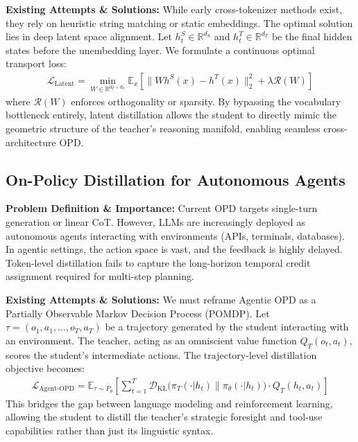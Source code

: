 \documentclass{article} %
\begin{document}
\textbf{Existing Attempts \& Solutions:} While early cross-tokenizer methods exist, they rely on heuristic string matching or static embeddings. The optimal solution lies in deep latent space alignment. Let $h_t^S \in \mathbb{R}^{d_S}$ and $h_t^T \in \mathbb{R}^{d_T}$ be the final hidden states before the unembedding layer. We formulate a continuous optimal transport loss:
\begin{align}
\mathcal{L}_{\text{Latent}} = \min_{W \in \mathbb{R}^{d_T \times d_S}} \mathbb{E}_{x} \left[ \parallel W h^S(x) - h^T(x) \parallel_2^2 + \lambda \mathcal{R}(W) \right]
\end{align}
where $\mathcal{R}(W)$ enforces orthogonality or sparsity. By bypassing the vocabulary bottleneck entirely, latent distillation allows the student to directly mimic the geometric structure of the teacher's reasoning manifold, enabling seamless cross-architecture OPD.

\subsection{On-Policy Distillation for Autonomous Agents}
\textbf{Problem Definition \& Importance:} Current OPD targets single-turn generation or linear CoT. However, LLMs are increasingly deployed as autonomous agents interacting with environments (APIs, terminals, databases). In agentic settings, the action space is vast, and the feedback is highly delayed. Token-level distillation fails to capture the long-horizon temporal credit assignment required for multi-step planning.

\textbf{Existing Attempts \& Solutions:} We must reframe Agentic OPD as a Partially Observable Markov Decision Process (POMDP). Let $\tau = (o_1, a_1, \dots, o_T, a_T)$ be a trajectory generated by the student interacting with an environment. The teacher, acting as an omniscient value function $Q_T(o_t, a_t)$, scores the student's intermediate actions. The trajectory-level distillation objective becomes:
\begin{align}
\mathcal{L}_{\text{Agent-OPD}} = \mathbb{E}_{\tau \sim P_\theta} \left[ \sum_{t=1}^T \mathcal{D}_{\text{KL}}\Big( \pi_T(\cdot | h_t) \parallel \pi_\theta(\cdot | h_t) \Big) \cdot Q_T(h_t, a_t) \right]
\end{align}
This bridges the gap between language modeling and reinforcement learning, allowing the student to distill the teacher's strategic foresight and tool-use capabilities rather than just its linguistic syntax.
\end{document}
